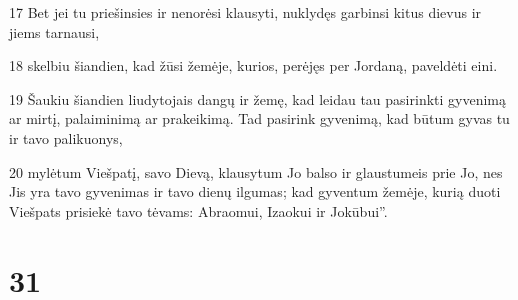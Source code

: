 \par 17 Bet jei tu priešinsies ir nenorėsi klausyti, nuklydęs garbinsi kitus dievus ir jiems tarnausi, 
\par 18 skelbiu šiandien, kad žūsi žemėje, kurios, perėjęs per Jordaną, paveldėti eini. 
\par 19 Šaukiu šiandien liudytojais dangų ir žemę, kad leidau tau pasirinkti gyvenimą ar mirtį, palaiminimą ar prakeikimą. Tad pasirink gyvenimą, kad būtum gyvas tu ir tavo palikuonys, 
\par 20 mylėtum Viešpatį, savo Dievą, klausytum Jo balso ir glaustumeis prie Jo, nes Jis yra tavo gyvenimas ir tavo dienų ilgumas; kad gyventum žemėje, kurią duoti Viešpats prisiekė tavo tėvams: Abraomui, Izaokui ir Jokūbui”.



\chapter{31}


